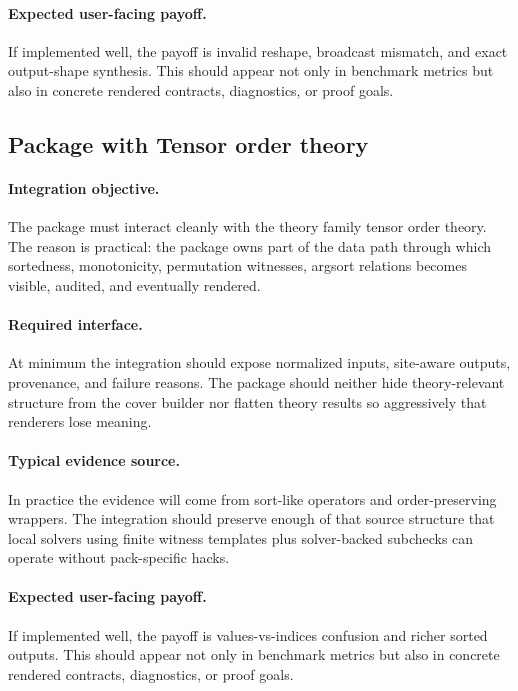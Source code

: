 \documentclass[11pt]{report}
\DeclareRobustCommand{\py}[1]{\texttt{\detokenize{#1}}}
\theoremstyle{definition}
\theoremstyle{plain}
\begin{document}
\paragraph{Expected user-facing payoff.}
If implemented well, the payoff is invalid reshape, broadcast mismatch, and exact output-shape synthesis. This should appear not only
in benchmark metrics but also in concrete rendered contracts,
diagnostics, or proof goals.


\subsection{Package \py{src/deppy/core} with Tensor order theory}

\paragraph{Integration objective.}
The package \py{src/deppy/core} must interact cleanly with the
theory family tensor order theory. The reason is practical: the
package owns part of the data path through which sortedness, monotonicity, permutation witnesses, argsort relations becomes
visible, audited, and eventually rendered.

\paragraph{Required interface.}
At minimum the integration should expose normalized inputs, site-aware
outputs, provenance, and failure reasons. The package should neither hide
theory-relevant structure from the cover builder nor flatten theory
results so aggressively that renderers lose meaning.

\paragraph{Typical evidence source.}
In practice the evidence will come from sort-like operators and order-preserving wrappers. The integration should
preserve enough of that source structure that local solvers using finite witness templates plus solver-backed subchecks
can operate without pack-specific hacks.

\paragraph{Expected user-facing payoff.}
If implemented well, the payoff is values-vs-indices confusion and richer sorted outputs. This should appear not only
in benchmark metrics but also in concrete rendered contracts,
diagnostics, or proof goals.
\end{document}
